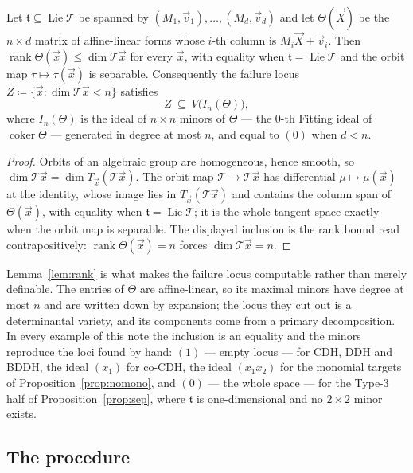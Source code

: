 \documentclass{aicr-solution}
\newcommand{\vx}{\vec{x}}
\newcommand{\vX}{\vec{X}}
\newcommand{\Lie}{\operatorname{Lie}}
\newcommand{\tge}{\mathfrak{t}}
\newcommand{\vvec}{\vec{v}}   %
\newcommand{\rk}{\operatorname{rank}}
\begin{document}
\begin{lemma}
\label{lem:rank}
Let $\tge\subseteq\Lie\mathcal T$ be spanned by $(M_1,\vvec_1),\dots,(M_d,\vvec_d)$ and let
$\Theta(\vX)$ be the $n\times d$ matrix of affine-linear forms whose $i$-th column is
$M_i\vX+\vvec_i$. Then $\rk\Theta(\vx)\le\dim\mathcal T\vx$ for every $\vx$, with equality when
$\tge=\Lie\mathcal T$ and the orbit map $\tau\mapsto\tau(\vx)$ is separable. Consequently the
failure locus $Z\coloneqq\{\vx:\dim\mathcal T\vx<n\}$ satisfies
\[
  Z\ \subseteq\ V\bigl(I_n(\Theta)\bigr),
\]
where $I_n(\Theta)$ is the ideal of $n\times n$ minors of $\Theta$ --- the $0$-th Fitting ideal
of $\operatorname{coker}\Theta$ --- generated in degree at most $n$, and equal to $(0)$ when
$d<n$.
\end{lemma}
\begin{proof}
Orbits of an algebraic group are homogeneous, hence smooth, so
$\dim\mathcal T\vx=\dim T_{\vx}(\mathcal T\vx)$. The orbit map $\mathcal T\to\mathcal T\vx$ has
differential $\mu\mapsto\mu(\vx)$ at the identity, whose image lies in $T_{\vx}(\mathcal T\vx)$
and contains the column span of $\Theta(\vx)$, with equality when $\tge=\Lie\mathcal T$; it is
the whole tangent space exactly when the orbit map is separable. The displayed inclusion is the
rank bound read contrapositively: $\rk\Theta(\vx)=n$ forces $\dim\mathcal T\vx=n$.
\end{proof}

Lemma~\ref{lem:rank} is what makes the failure locus computable rather than merely definable.
The entries of $\Theta$ are affine-linear, so its maximal minors have degree at most $n$ and are
written down by expansion; the locus they cut out is a determinantal variety, and its components
come from a primary decomposition. In every example of this note the inclusion is an equality
and the minors reproduce the loci found by hand: $(1)$ --- empty locus --- for CDH, DDH and
BDDH, the ideal $(x_1)$ for co-CDH, the ideal $(x_1x_2)$ for the monomial targets of
Proposition~\ref{prop:nomono}, and $(0)$ --- the whole space --- for the Type-3 half of
Proposition~\ref{prop:sep}, where $\tge$ is one-dimensional and no $2\times 2$ minor exists.

\subsection{The procedure}
\end{document}
